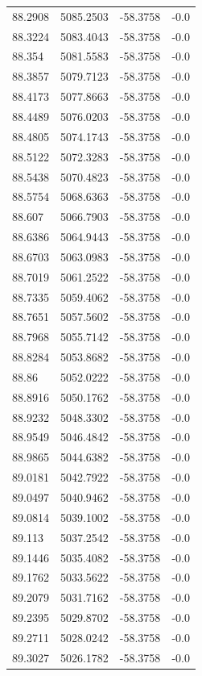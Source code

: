 \begin{table}[H]
\begin{tabular}{llll}
88.2908 & 5085.2503 & -58.3758 & -0.0 \\
88.3224 & 5083.4043 & -58.3758 & -0.0 \\
88.354 & 5081.5583 & -58.3758 & -0.0 \\
88.3857 & 5079.7123 & -58.3758 & -0.0 \\
88.4173 & 5077.8663 & -58.3758 & -0.0 \\
88.4489 & 5076.0203 & -58.3758 & -0.0 \\
88.4805 & 5074.1743 & -58.3758 & -0.0 \\
88.5122 & 5072.3283 & -58.3758 & -0.0 \\
88.5438 & 5070.4823 & -58.3758 & -0.0 \\
88.5754 & 5068.6363 & -58.3758 & -0.0 \\
88.607 & 5066.7903 & -58.3758 & -0.0 \\
88.6386 & 5064.9443 & -58.3758 & -0.0 \\
88.6703 & 5063.0983 & -58.3758 & -0.0 \\
88.7019 & 5061.2522 & -58.3758 & -0.0 \\
88.7335 & 5059.4062 & -58.3758 & -0.0 \\
88.7651 & 5057.5602 & -58.3758 & -0.0 \\
88.7968 & 5055.7142 & -58.3758 & -0.0 \\
88.8284 & 5053.8682 & -58.3758 & -0.0 \\
88.86 & 5052.0222 & -58.3758 & -0.0 \\
88.8916 & 5050.1762 & -58.3758 & -0.0 \\
88.9232 & 5048.3302 & -58.3758 & -0.0 \\
88.9549 & 5046.4842 & -58.3758 & -0.0 \\
88.9865 & 5044.6382 & -58.3758 & -0.0 \\
89.0181 & 5042.7922 & -58.3758 & -0.0 \\
89.0497 & 5040.9462 & -58.3758 & -0.0 \\
89.0814 & 5039.1002 & -58.3758 & -0.0 \\
89.113 & 5037.2542 & -58.3758 & -0.0 \\
89.1446 & 5035.4082 & -58.3758 & -0.0 \\
89.1762 & 5033.5622 & -58.3758 & -0.0 \\
89.2079 & 5031.7162 & -58.3758 & -0.0 \\
89.2395 & 5029.8702 & -58.3758 & -0.0 \\
89.2711 & 5028.0242 & -58.3758 & -0.0 \\
89.3027 & 5026.1782 & -58.3758 & -0.0 \\

\end{tabular}
\end{table}
